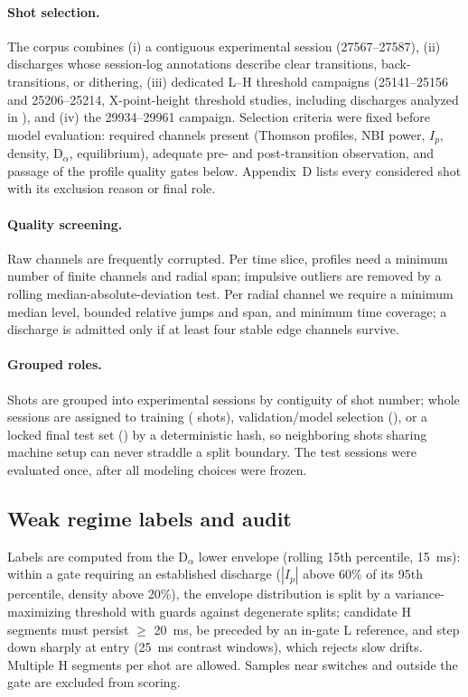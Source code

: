 \documentclass[11pt]{article}
\begin{document}
\paragraph{Shot selection.} The corpus combines
(i) a contiguous experimental session (27567--27587),
(ii) discharges whose session-log annotations describe clear transitions,
back-transitions, or dithering,
(iii) dedicated L--H threshold campaigns (25141--25156 and 25206--25214,
X-point-height threshold studies, including discharges analyzed in
\citealp{meyer2011}), and
(iv) the 29934--29961 campaign.
Selection criteria were fixed before model evaluation: required channels
present (Thomson profiles, NBI power, $I_p$, density, D$_\alpha$,
equilibrium), adequate pre- and post-transition observation, and passage
of the profile quality gates below. Appendix~D lists every considered
shot with its exclusion reason or final role.

\paragraph{Quality screening.} Raw channels are frequently corrupted.
Per time slice, profiles need a minimum number of finite channels and
radial span; impulsive outliers are removed by a rolling
median-absolute-deviation test. Per radial channel we require a minimum
median level, bounded relative jumps and span, and minimum time coverage;
a discharge is admitted only if at least four stable edge channels
survive.

\paragraph{Grouped roles.} Shots are grouped into experimental sessions by
contiguity of shot number; whole sessions are assigned to training
(\nTrain{} shots), validation/model selection (\nVal{}), or a locked
final test set (\nTest{}) by a deterministic hash, so neighboring shots
sharing machine setup can never straddle a split boundary. The test
sessions were evaluated once, after all modeling choices were frozen.

\subsection{Weak regime labels and audit}
\label{sec:labels}

Labels are computed from the D$_\alpha$ lower envelope (rolling 15th
percentile, \SI{15}{ms}): within a gate requiring an established discharge
($|I_p|$ above 60\% of its 95th percentile, density above 20\%), the
envelope distribution is split by a variance-maximizing threshold with
guards against degenerate splits; candidate H segments must persist
$\geq$ \SI{20}{ms}, be preceded by an in-gate L reference, and step down
sharply at entry (\SI{25}{ms} contrast windows), which rejects slow
drifts. Multiple H segments per shot are allowed. Samples near switches
and outside the gate are excluded from scoring.
\end{document}

